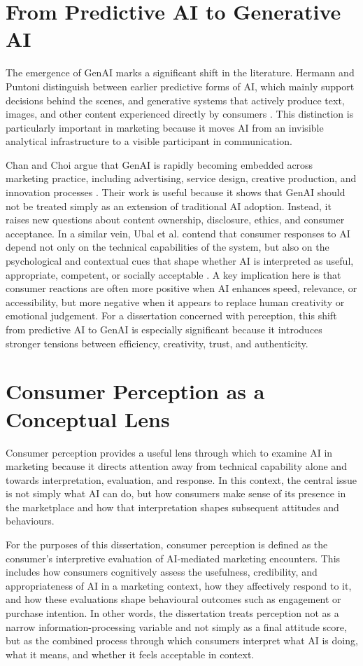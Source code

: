 \section{From Predictive AI to Generative AI}
The emergence of GenAI marks a significant shift in the literature. Hermann and Puntoni distinguish between earlier predictive forms of AI, which mainly support decisions behind the scenes, and generative systems that actively produce text, images, and other content experienced directly by consumers \cite{hermann2024consumer}. This distinction is particularly important in marketing because it moves AI from an invisible analytical infrastructure to a visible participant in communication.

Chan and Choi argue that GenAI is rapidly becoming embedded across marketing practice, including advertising, service design, creative production, and innovation processes \cite{chan2025genai}. Their work is useful because it shows that GenAI should not be treated simply as an extension of traditional AI adoption. Instead, it raises new questions about content ownership, disclosure, ethics, and consumer acceptance. In a similar vein, Ubal et al. contend that consumer responses to AI depend not only on the technical capabilities of the system, but also on the psychological and contextual cues that shape whether AI is interpreted as useful, appropriate, competent, or socially acceptable \cite{ubal2024framework}. A key implication here is that consumer reactions are often more positive when AI enhances speed, relevance, or accessibility, but more negative when it appears to replace human creativity or emotional judgement. For a dissertation concerned with perception, this shift from predictive AI to GenAI is especially significant because it introduces stronger tensions between efficiency, creativity, trust, and authenticity.

\section{Consumer Perception as a Conceptual Lens}
Consumer perception provides a useful lens through which to examine AI in marketing because it directs attention away from technical capability alone and towards interpretation, evaluation, and response. In this context, the central issue is not simply what AI can do, but how consumers make sense of its presence in the marketplace and how that interpretation shapes subsequent attitudes and behaviours.

For the purposes of this dissertation, consumer perception is defined as the consumer's interpretive evaluation of AI-mediated marketing encounters. This includes how consumers cognitively assess the usefulness, credibility, and appropriateness of AI in a marketing context, how they affectively respond to it, and how these evaluations shape behavioural outcomes such as engagement or purchase intention. In other words, the dissertation treats perception not as a narrow information-processing variable and not simply as a final attitude score, but as the combined process through which consumers interpret what AI is doing, what it means, and whether it feels acceptable in context.

